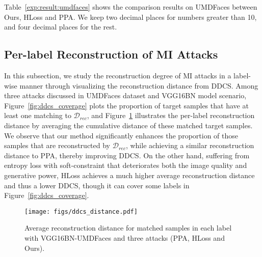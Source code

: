 Table~\ref{exp:result:umdfaces} shows the comparison results on UMDFaces between Ours, HLoss and PPA. %
We keep two decimal places for numbers greater than 10, and four decimal places for the rest. %

\subsection{Per-label Reconstruction of MI Attacks}
In this subsection, we study the reconstruction degree of MI attacks in a label-wise manner through visualizing the reconstruction distance from DDCS.
Among three attacks discussed in UMDFaces dataset and VGG16BN model scenario, Figure~\ref{fig:ddcs_coverage} plots the proportion of target samples that have at least one matching to $\mathcal{D}_{rec}$, and Figure~\ref{fig:ddcs_distance} illustrates the per-label reconstruction distance by averaging the cumulative distance of these matched target samples.
We observe that our method significantly enhances the proportion of those samples that are reconstructed by $\mathcal{D}_{rec}$, while achieving a similar reconstruction distance to PPA, thereby improving DDCS.
On the other hand, suffering from entropy loss with soft-constraint that deteriorates both the image quality and generative power, HLoss achieves a much higher average reconstruction distance and thus a lower DDCS, though it can cover some labels in Figure~\ref{fig:ddcs_coverage}.

\begin{figure}[htb]%
	\centering
	\texttt{[image: figs/ddcs\_distance.pdf]}
	\caption{Average reconstruction distance for matched samples in each label with VGG16BN-UMDFaces and three attacks (PPA, HLoss and Ours).}
	\label{fig:ddcs_distance}
 \vspace{-0.1in}
\end{figure}











